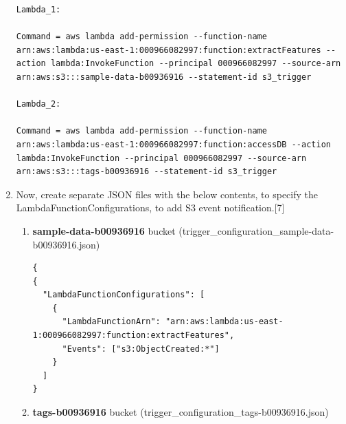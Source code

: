 \begin{enumerate}


\begin{mdframed}[linewidth=1pt]
\lstset{language=PowerShell}
\begin{lstlisting}[basicstyle=\ttfamily\small, breaklines=true]
Lambda_1:

Command = aws lambda add-permission --function-name arn:aws:lambda:us-east-1:000966082997:function:extractFeatures --action lambda:InvokeFunction --principal 000966082997 --source-arn arn:aws:s3:::sample-data-b00936916 --statement-id s3_trigger

Lambda_2:

Command = aws lambda add-permission --function-name arn:aws:lambda:us-east-1:000966082997:function:accessDB --action lambda:InvokeFunction --principal 000966082997 --source-arn arn:aws:s3:::tags-b00936916 --statement-id s3_trigger
\end{lstlisting}
\end{mdframed}

    \item Now, create separate JSON files with the below contents, to specify the LambdaFunctionConfigurations, to add S3 event notification.[7]
    \begin{enumerate}
        \item \textbf{sample-data-b00936916} bucket (trigger\_configuration\_sample-data-b00936916.json)



\begin{mdframed}[linewidth=1pt]
\lstset{language=json}
\begin{lstlisting}
{
{
  "LambdaFunctionConfigurations": [
    {
      "LambdaFunctionArn": "arn:aws:lambda:us-east-1:000966082997:function:extractFeatures",
      "Events": ["s3:ObjectCreated:*"]
    }
  ]
}
\end{lstlisting}
\end{mdframed}
      \item \textbf{tags-b00936916} bucket (trigger\_configuration\_tags-b00936916.json)


\end{enumerate}
\end{enumerate}

